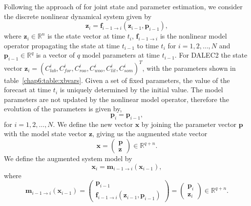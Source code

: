 Following the approach of \citet{Smith2011436} for joint state and parameter estimation, we consider the discrete nonlinear dynamical system given by
%
\begin{equation}
\textbf{z}_{i} = \textbf{f}_{i-1\rightarrow i}(\textbf{z}_{i-1}, \textbf{p}_{i-1}),
\end{equation}
where \( \textbf{z}_{i} \in \mathbb{R}^{n} \) is the state vector at time \( t_i \), \(\textbf{f}_{i-1 \rightarrow i}\) is the nonlinear model operator propagating the state at time \(t_{i-1}\) to time \(t_{i}\) for \(i = 1, 2, \dots, N\) and \(\textbf{p}_{i-1} \in \mathbb{R}^{q}\) is a vector of \(q\) model parameters at time \(t_{i-1}\). For DALEC2 the state vector \(\textbf{z}_{i}=(C_{lab}^{i}, C_{for}^{i}, C_{roo}^{i}, C_{woo}^{i}, C_{lit}^{i}, C_{som}^{i})^{T}\), with the parameters shown in table~\ref{chap6:table:xbvars}. Given a set of fixed parameters, the value of the forecast at time \(t_i\) is uniquely determined by the initial value. The model parameters are not updated by the nonlinear model operator, therefore the evolution of the parameters is given by,
%
\begin{equation}
\textbf{p}_{i} = \textbf{p}_{i-1}, 
\end{equation}
for $i= 1, 2, \dots, N$. We define the new vector $\textbf{x}$ by joining the parameter vector $\textbf{p}$ with the model state vector $\textbf{z}$, giving us the augmented state vector
\begin{equation}
\textbf{x} =
\begin{pmatrix}
\textbf{p} \\
\textbf{z}
\end{pmatrix}
\in \mathbb{R}^{q+n}.
\end{equation}
We define the augmented system model by
\begin{equation}
\textbf{x}_{i} = \textbf{m}_{i-1 \rightarrow i}(\textbf{x}_{i-1}), \label{chap6:eqn:nonlinmod}
\end{equation}
where
\begin{equation}
\textbf{m}_{i-1\rightarrow i}(\textbf{x}_{i-1}) =
\begin{pmatrix}
\textbf{p}_{i-1} \\
\textbf{f}_{i-1\rightarrow i}(\textbf{z}_{i-1}, \textbf{p}_{i-1})
\end{pmatrix}
=
\begin{pmatrix}
\textbf{p}_{i} \\
\textbf{z}_{i}
\end{pmatrix}
\in \mathbb{R}^{q+n}.
\end{equation}
